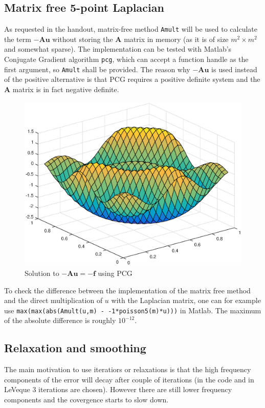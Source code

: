 \documentclass[main.tex]{subfiles}
\begin{document}
\subsection*{Matrix free 5-point Laplacian}
As requested in the handout, matrix-free method \texttt{Amult} will be used to calculate the term $\mathbf{-A u}$ without storing the $\mathbf{A}$ matrix in memory (as it is of size $m^2 \times m^2$ and somewhat sparse). The implementation can be tested with Matlab's Conjugate Gradient algorithm \texttt{pcg}, which can accept a function handle as the first argument, so \texttt{Amult} shall be provided. The reason why $-\mathbf{A u}$ is used instead of the positive alternative is that PCG requires a positive definite system and the $\mathbf{A}$ matrix is in fact negative definite.
\begin{figure}[h]
    \centering
    \includegraphics[width=\textwidth]{../Figures/ex31}
    \caption{Solution to $-\mathbf{A u} = -\mathbf{f}$ using PCG}
\end{figure}
To check the difference between the implementation of the matrix free method and the direct multiplication of $u$ with the Laplacian matrix, one can for example use \texttt{max(max(abs(Amult(u,m) - -1*poisson5(m)*u)))} in Matlab. The maximum of the absolute difference is roughly $10^{-12}$.


\subsection*{Relaxation and smoothing}
The main motivation to use iteratiors or relaxations is that the high frequency components of the error will decay after couple of iterations (in the code and in LeVeque 3 iterations are chosen). However there are still lower frequency components and the covergence starts to slow down.
\end{document}
